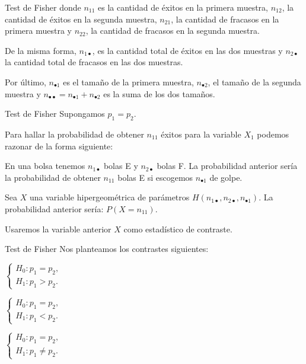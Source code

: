 \documentclass[
  ignorenonframetext,
]{beamer}
\begin{document}
\begin{frame}{Test de Fisher}
\protect\hypertarget{test-de-fisher-1}{}
donde \(n_{11}\) es la cantidad de éxitos en la primera muestra,
\(n_{12}\), la cantidad de éxitos en la segunda muestra, \(n_{21}\), la
cantidad de fracasos en la primera muestra y \(n_{22}\), la cantidad de
fracasos en la segunda muestra.

De la misma forma, \(n_{1\bullet}\), es la cantidad total de éxitos en
las dos muestras y \(n_{2\bullet}\) la cantidad total de fracasos en las
dos muestras.

Por último, \(n_{\bullet 1}\) es el tamaño de la primera muestra,
\(n_{\bullet 2}\), el tamaño de la segunda muestra y
\(n_{\bullet\bullet}=n_{\bullet 1}+n_{\bullet 2}\) es la suma de los dos
tamaños.
\end{frame}

\begin{frame}{Test de Fisher}
\protect\hypertarget{test-de-fisher-2}{}
Supongamos \(p_1=p_2\).

Para hallar la probabilidad de obtener \(n_{11}\) éxitos para la
variable \(X_1\) podemos razonar de la forma siguiente:

En una bolsa tenemos \(n_{1\bullet}\) bolas E y \(n_{2\bullet}\) bolas
F. La probabilidad anterior sería la probabilidad de obtener \(n_{11}\)
bolas E si escogemos \(n_{\bullet 1}\) de golpe.

Sea \(X\) una variable hipergeométrica de parámetros
\(H(n_{1\bullet},n_{2\bullet},n_{\bullet1})\). La probabilidad anterior
sería: \(P(X=n_{11})\).

Usaremos la variable anterior \(X\) como estadístico de contraste.
\end{frame}

\begin{frame}{Test de Fisher}
\protect\hypertarget{test-de-fisher-3}{}
Nos planteamos los contrastes siguientes:

\(\left\{\begin{array}{l} H_0:p_1=p_2,\\ H_1:p_1> p_2. \end{array}\right.\)

\(\left\{\begin{array}{l} H_0:p_1=p_2,\\ H_1:p_1< p_2. \end{array}\right.\)

\(\left\{\begin{array}{l} H_0:p_1=p_2,\\ H_1:p_1\neq p_2. \end{array}\right.\)
\end{frame}
\end{document}
